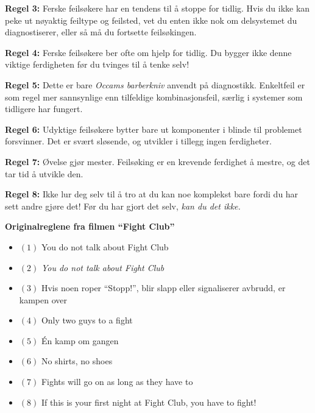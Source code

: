 \vskip 10pt

{\bf Regel 3:} Ferske feilsøkere har en tendens til å stoppe for tidlig. Hvis du ikke kan peke ut nøyaktig feiltype og feilsted, vet du enten ikke nok om delsystemet du diagnostiserer, eller så må du fortsette feilsøkingen.

\vskip 10pt

{\bf Regel 4:} Ferske feilsøkere ber ofte om hjelp for tidlig. Du bygger ikke denne viktige ferdigheten før du tvinges til å tenke selv!

\vskip 10pt

{\bf Regel 5:} Dette er bare {\it Occams barberkniv} anvendt på diagnostikk. Enkeltfeil er som regel mer sannsynlige enn tilfeldige kombinasjonsfeil, særlig i systemer som tidligere har fungert.

\vskip 10pt

{\bf Regel 6:} Udyktige feilsøkere bytter bare ut komponenter i blinde til problemet forsvinner. Det er svært sløsende, og utvikler i tillegg ingen ferdigheter.

\vskip 10pt

{\bf Regel 7:} Øvelse gjør mester. Feilsøking er en krevende ferdighet å mestre, og det tar tid å utvikle den.

\vskip 10pt

{\bf Regel 8:} Ikke lur deg selv til å tro at du kan noe komplekst bare fordi du har sett andre gjøre det! Før du har gjort det selv, {\it kan du det ikke.}

\vskip 10pt

 






\noindent
{\bf Originalreglene fra filmen ``Fight Club''}

\begin{itemize}
\item{$(1)$} You do not talk about Fight Club
\vskip 10pt
\item{$(2)$} {\it You do not talk about Fight Club}
\vskip 10pt
\item{$(3)$} Hvis noen roper ``Stopp!'', blir slapp eller signaliserer avbrudd, er kampen over
\vskip 10pt
\item{$(4)$} Only two guys to a fight
\vskip 10pt
\item{$(5)$} Én kamp om gangen
\vskip 10pt
\item{$(6)$} No shirts, no shoes
\vskip 10pt
\item{$(7)$} Fights will go on as long as they have to
\vskip 10pt
\item{$(8)$} If this is your first night at Fight Club, you have to fight!
\end{itemize}



